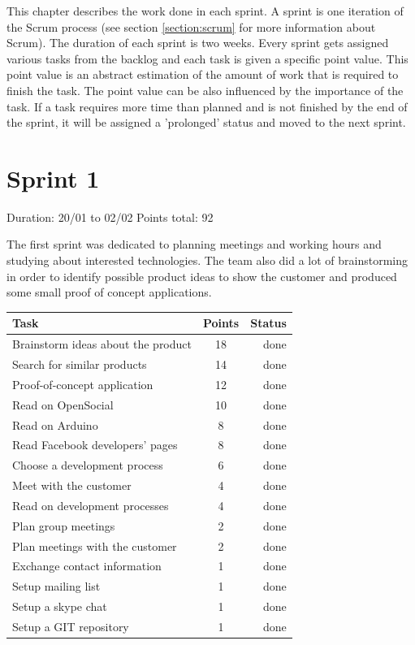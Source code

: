 
This chapter describes the work done in each sprint. A sprint is one iteration of the Scrum process
(see section \ref{section:scrum} for more information about Scrum). The duration of each sprint is two weeks.
Every sprint gets assigned various tasks from the backlog and each task is given a specific point value.
This point value is an abstract estimation of the amount of work that is required to finish the task.
The point value can be also influenced by the importance of the task. If a task requires more time than
planned and is not finished by the end of the sprint, it will be assigned a 'prolonged' status and
moved to the next sprint.

\newpage

\section{Sprint 1}

Duration: 20/01 to 02/02
Points total: 92

The first sprint was dedicated to planning meetings and working hours
and studying about interested technologies. The team also did a lot of
brainstorming in order to identify possible product ideas to show the
customer and produced some small proof of concept applications.

\begin{table}[ht!]
\begin{tabular}{ | l | c | r | }

\hline
\textbf{Task} & \textbf{Points} & \textbf{Status} \\
\hline

Brainstorm ideas about the product  & 18 & done \\
\hline
Search for similar products     & 14 & done \\
\hline
Proof-of-concept application        & 12 & done \\
\hline
Read on OpenSocial          & 10 & done \\
\hline
Read on Arduino             & 8  & done \\
\hline
Read Facebook developers' pages     & 8  & done \\
\hline
Choose a development process        & 6  & done \\
\hline
Meet with the customer          & 4  & done \\
\hline
Read on development processes       & 4  & done \\
\hline
Plan group meetings			& 2  & done \\
\hline
Plan meetings with the customer		& 2  & done \\
\hline
Exchange contact information        & 1  & done \\
\hline
Setup mailing list			& 1  & done \\
\hline
Setup a skype chat			& 1  & done \\
\hline
Setup a GIT repository			& 1  & done \\
\hline

\end{tabular}
\end{table}

